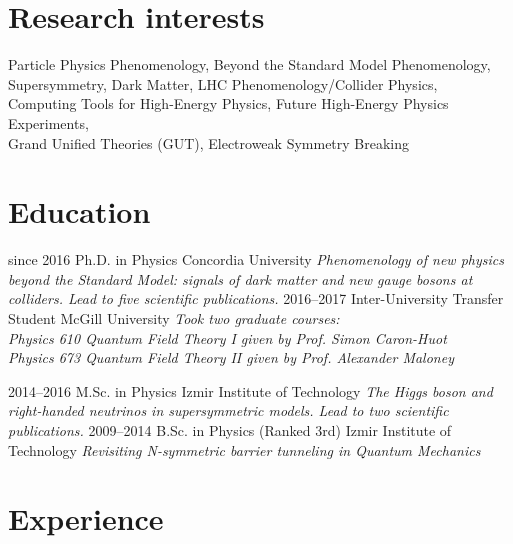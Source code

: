 \documentclass[]{friggeri-cv}
\begin{document}
\section{Research interests}

Particle Physics Phenomenology, Beyond the Standard Model Phenomenology, \\
Supersymmetry, Dark Matter, LHC Phenomenology/Collider Physics, \\
Computing Tools for High-Energy Physics, Future High-Energy Physics Experiments, \\
Grand Unified Theories (GUT), Electroweak Symmetry Breaking \\

\section{Education}
\begin{entrylist}
  \entry
    {since 2016}
    {Ph.D. in Physics}
    {Concordia University}
    {\emph{Phenomenology of new physics beyond the Standard Model: signals of dark matter and new gauge bosons at colliders. Lead to five scientific publications.}}
   \entry
   {2016--2017}
   {Inter-University Transfer Student}
   {McGill University}
   {\emph{Took two graduate courses: \\
      Physics 610 Quantum Field Theory I given by Prof. Simon Caron-Huot \\
      Physics 673 Quantum Field Theory II given by Prof. Alexander Maloney }}
   
  \entry
    {2014–2016}
    {M.Sc. in Physics}
    {Izmir Institute of Technology}
    {\emph{The Higgs boson and right-handed neutrinos in supersymmetric models. Lead to two scientific publications.}}
  \entry
    {2009–2014}
    {B.Sc. in Physics (Ranked 3rd)}
    {Izmir Institute of Technology}
    {\emph{Revisiting N-symmetric barrier tunneling in Quantum Mechanics}}
    

\end{entrylist}

\section{Experience}
\end{document}

